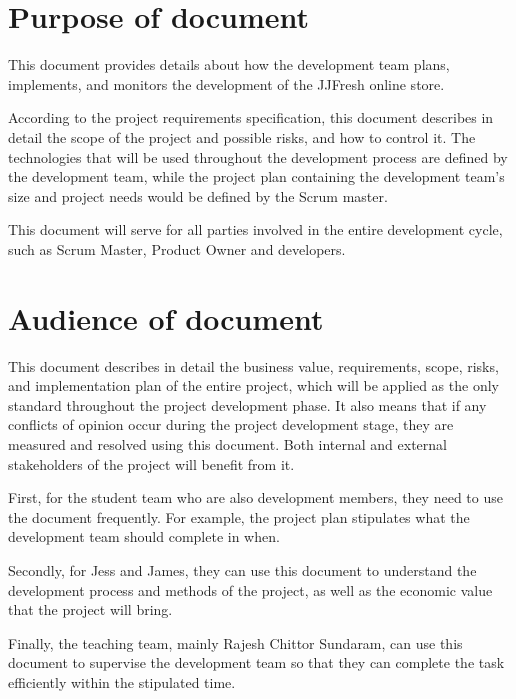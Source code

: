 \documentclass{report}
\begin{document}
\section{Purpose of document}
   This document provides details about how the development team plans, implements, and monitors the development of the JJFresh online store. 

   According to the project requirements specification, this document describes in detail the scope of the project and possible risks, and how to control it. The technologies that will be used throughout the development process are defined by the development team, while the project plan containing the development team's size and project needs would be defined by the Scrum master.

   This document will serve for all parties involved in the entire development cycle, such as Scrum Master, Product Owner and developers.

\section{Audience of document}
\label{sec:audienceOfDocument}
This document describes in detail the business value, requirements, scope, risks, and implementation plan of the entire project, which will be applied as the only standard throughout the project development phase. It also means that if any conflicts of opinion occur during the project development stage, they are measured and resolved using this document. Both internal and external stakeholders of the project will benefit from it.

First, for the student team who are also development members, they need to use the document frequently. For example, the project plan stipulates what the development team should complete in when. 

Secondly, for Jess and James, they can use this document to understand the development process and methods of the project, as well as the economic value that the project will bring. 

Finally, the teaching team, mainly Rajesh Chittor Sundaram, can use this document to supervise the development team so that they can complete the task efficiently within the stipulated time.
\end{document}
